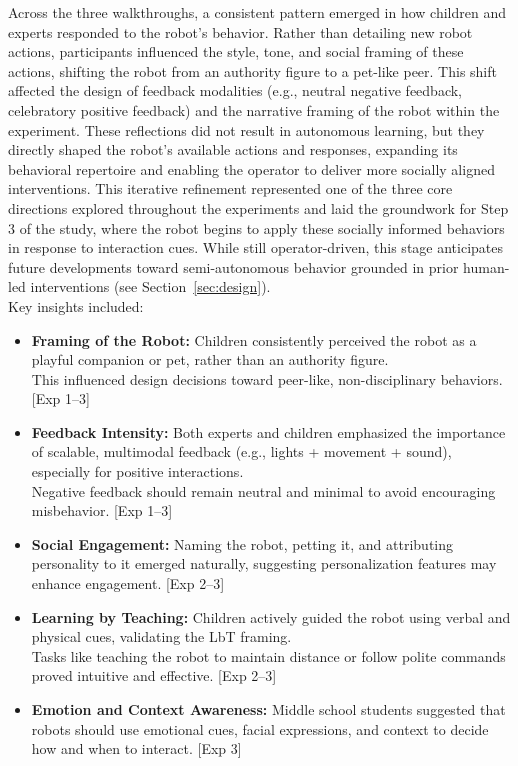 \documentclass[a4paper]{usiinfbachelorproject}
\begin{document}
Across the three walkthroughs, a consistent pattern emerged in how children and experts responded to the robot's behavior.
Rather than detailing new robot actions, participants influenced the style, tone, and social framing of these actions, shifting the robot from an authority figure to a pet-like peer.
This shift affected the design of feedback modalities (e.g., neutral negative feedback, celebratory positive feedback) and the narrative framing of the robot within the experiment.
These reflections did not result in autonomous learning, but they directly shaped the robot's available actions and responses,
expanding its behavioral repertoire and enabling the operator to deliver more socially aligned interventions.
This iterative refinement represented one of the three core directions explored throughout the experiments and laid the groundwork for Step 3 of the study,
where the robot begins to apply these socially informed behaviors in response to interaction cues.
While still operator-driven, this stage anticipates future developments toward semi-autonomous behavior grounded in prior human-led interventions (see Section~\ref{sec:design}).
\\
Key insights included:
\begin{itemize}
    \item \textbf{Framing of the Robot:} Children consistently perceived the robot as a playful companion or pet, rather than an authority figure.\\
          This influenced design decisions toward peer-like, non-disciplinary behaviors. [Exp 1--3]
    \item \textbf{Feedback Intensity:} Both experts and children emphasized the importance of scalable, multimodal feedback (e.g., lights + movement + sound), especially for positive interactions.\\
          Negative feedback should remain neutral and minimal to avoid encouraging misbehavior. [Exp 1--3]
    \item \textbf{Social Engagement:} Naming the robot, petting it, and attributing personality to it emerged naturally, suggesting personalization features may enhance engagement. [Exp 2--3]
    \item \textbf{Learning by Teaching:} Children actively guided the robot using verbal and physical cues, validating the LbT framing.\\
          Tasks like teaching the robot to maintain distance or follow polite commands proved intuitive and effective. [Exp 2--3]
    \item \textbf{Emotion and Context Awareness:} Middle school students suggested that robots should use emotional cues, facial expressions, and context to decide how and when to interact. [Exp 3]
\end{itemize}
\end{document}

